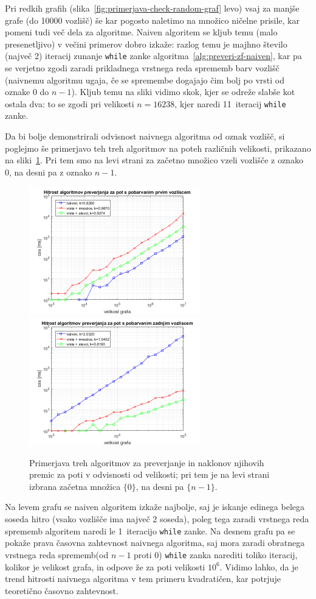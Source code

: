 \documentclass[12pt,a4paper,twoside]{article}
\theoremstyle{definition} %
\theoremstyle{plain} %
\numberwithin{equation}{section}  %
\begin{document}
Pri redkih grafih (slika~\ref{fig:primerjava-check-random-graf} levo) vsaj za manjše grafe (do 10000 vozlišč) še kar pogosto naletimo na množico ničelne prisile, kar pomeni tudi več dela za algoritme. Naiven algoritem se kljub temu (malo presenetljivo) v večini primerov dobro izkaže: razlog temu je majhno število (največ 2) iteracij zunanje \texttt{while} zanke algoritma~\ref{alg:preveri-zf-naiven}, kar pa se verjetno zgodi zaradi prikladnega vrstnega reda sprememb barv vozlišč (naivnemu algoritmu ugaja, če se spremembe dogajajo čim bolj po vrsti od oznake 0 do $n-1$). Kljub temu na sliki vidimo skok, kjer se odreže slabše kot ostala dva: to se zgodi pri velikosti $n=16238$, kjer naredi 11~iteracij \texttt{while} zanke. 

Da bi bolje demonstrirali odvisnost naivnega algoritma od oznak vozlišč, si poglejmo še primerjavo teh treh algoritmov na poteh različnih velikosti, prikazano na sliki~\ref{fig:primerjava-check-pot}. Pri tem smo na levi strani za začetno množico vzeli vozlišče z oznako 0, na desni pa z oznako $n-1$.
\begin{figure}[h]
    \centering
    \includegraphics[width=210pt]{koda/results/plots/pot_prvo_vozlisce.png}
    \includegraphics[width=210pt]{koda/results/plots/pot_zadnje_vozlisce.png}
    \caption{Primerjava treh algoritmov za preverjanje in naklonov njihovih premic za poti v odvisnosti od velikosti; pri tem je na levi strani izbrana začetna množica $\{ 0 \}$, na desni pa $\{n-1\}$.}
    \label{fig:primerjava-check-pot}
\end{figure}
Na levem grafu se naiven algoritem izkaže najbolje, saj je iskanje edinega belega soseda hitro (vsako vozlišče ima največ 2 soseda), poleg tega zaradi vrstnega reda sprememb algoritem naredi le 1~iteracijo \texttt{while} zanke. Na desnem grafu pa se pokaže prava časovna zahtevnost naivnega algoritma, saj mora zaradi obratnega vrstnega reda sprememb(od $n-1$ proti 0) \texttt{while} zanka narediti toliko iteracij, kolikor je velikost grafa, in odpove že za poti velikosti $10^6$. Vidimo lahko, da je trend hitrosti naivnega algoritma v tem primeru kvadratičen, kar potrjuje teoretično časovno zahtevnost. 
\end{document}
